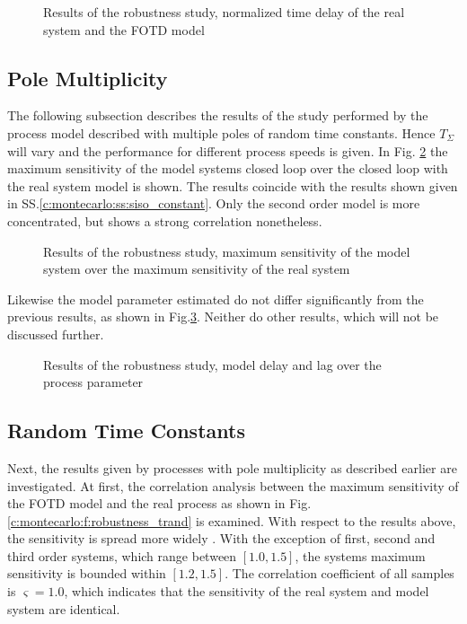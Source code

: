 \begin{figure}[H]\centering

\caption{Results of the robustness study, normalized time delay of the real system and the FOTD model}
\label{c:montecarlo:f:violin_tsum}
\end{figure}


\subsection{Pole Multiplicity}
\label{c:montecarlo:ss:polemultiplicity}

The following subsection describes the results of the study performed by 
the process model described with multiple poles of random time constants. Hence $T_\Sigma$ will vary and the performance for different process speeds is given. In Fig. \ref{c:montecarlo:f:robustness_poles} the maximum sensitivity of the model systems closed loop over the closed loop with the real system model is shown. The results coincide with the results shown given in SS.\ref{c:montecarlo:ss:siso_constant}. Only the second order model is more concentrated, but shows a strong correlation nonetheless.

\begin{figure}[H]\centering

\caption{Results of the robustness study, maximum sensitivity of the model system over the maximum sensitivity of the real system}
\label{c:montecarlo:f:robustness_poles}
\end{figure}

Likewise the model parameter estimated do not differ significantly from the previous results, as shown in Fig.\ref{c:montecarlo:f:parameter_poles}.
Neither do other results, which will not be discussed further.

\begin{figure}[H]\centering

\caption{Results of the robustness study, model delay and lag over the process parameter}
\label{c:montecarlo:f:parameter_poles}
\end{figure}

\subsection{Random Time Constants}
\label{c:montecarlo:ss:siso_tsumrand}

Next, the results given by processes with pole multiplicity as described earlier are investigated. At first, the correlation analysis between the maximum sensitivity of the FOTD model and the real process as shown in Fig.\ref{c:montecarlo:f:robustness_trand} is examined. With respect to the results above, the sensitivity is spread more widely . With the exception of first, second and third order systems, which range between $\left[1.0,1.5\right]$, the systems maximum sensitivity is bounded within $\left[ 1.2, 1.5 \right]$. The correlation coefficient of all samples is $\varsigma = 1.0$, which indicates that the sensitivity of the real system and model system are identical.

